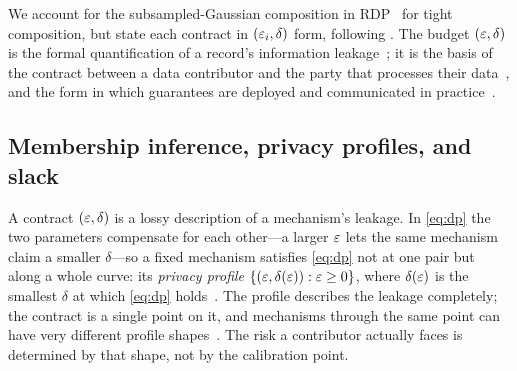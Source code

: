 
We account for the subsampled-Gaussian composition in \ac{RDP}~\cite{mironov2017renyi, abadi2016deep} for tight composition, but
state each contract in $(\varepsilon_i, \delta)$ form, following
\citet{boenisch2023have, kaiser2026your}. The budget $(\varepsilon, \delta)$
is the formal quantification of a record's information
leakage~\cite{dwork2006calibrating}; it is the basis of the contract
between a data contributor and the party that processes their
data~\cite{kaiser2026your}, and the form in which guarantees are
deployed and communicated in practice~\cite{cummings2024advancing}.

\subsection{Membership inference, privacy profiles, and slack}
\label{sec:mia}

A contract $(\varepsilon, \delta)$ is a lossy description of a mechanism's
leakage. In \cref{eq:dp} the two parameters compensate for each
other---a larger $\varepsilon$ lets the same mechanism claim a smaller
$\delta$---so a fixed mechanism satisfies \cref{eq:dp} not at one
pair but along a whole curve: its \emph{privacy profile} $\{(\varepsilon,
\delta(\varepsilon)) : \varepsilon \geq 0\}$, where $\delta(\varepsilon)$ is the smallest
$\delta$ at which \cref{eq:dp} holds~\cite{balle2020privacy}. The
profile describes the leakage completely; the contract is a single
point on it, and mechanisms through the same point can have very
different profile shapes~\cite{kaissis2024beyond, gomez2025harmful,
kaiser2026your}. The risk a contributor actually faces is determined
by that shape, not by the calibration point.

